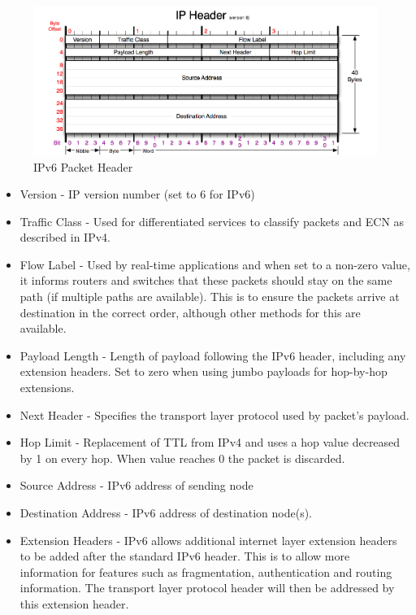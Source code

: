 \documentclass[final_report.tex]{subfiles}
\begin{document}
\begin{figure}[H]
	\centering
	\includegraphics[width=\textwidth]{img/ipv6header.png}
	\caption{IPv6 Packet Header \cite{ipv6}}
	\label{fig:ipv6}
\end{figure}

\begin{itemize}
	\item Version - IP version number (set to 6 for IPv6)
	\item Traffic Class - Used for differentiated services  to classify packets and ECN as described in IPv4.
	\item Flow Label - Used by real-time applications and when set to a non-zero value, it informs routers and switches that these packets should stay on the same path (if multiple paths are available). This is to ensure the packets arrive at destination in the correct order, although other methods for this are available.
	\item Payload Length - Length of payload following the IPv6 header, including any extension headers. Set to zero when using jumbo payloads for hop-by-hop extensions.
	\item Next Header - Specifies the transport layer protocol used by packet's payload.
	\item Hop Limit - Replacement of TTL from IPv4 and uses a hop value decreased by 1 on every hop. When value reaches 0 the packet is discarded.
	\item Source Address - IPv6 address of sending node
	\item Destination Address - IPv6 address of destination node(s).
	\item Extension Headers - IPv6 allows additional internet layer extension headers to be added after the standard IPv6 header. This is to allow more information for features such as fragmentation, authentication and routing information. The transport layer protocol header will then be addressed by this extension header.
\end{itemize}
\end{document}
